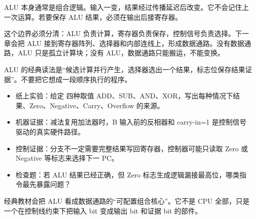ALU 本身通常是组合逻辑。输入一变，结果经过传播延迟后改变。它不会记住上一次运算。若要保存 ALU 结果，必须在输出后接寄存器。

这个边界必须分清：ALU 负责计算，寄存器负责保存，控制信号负责选择。下一章会把 ALU 接到寄存器阵列、选择器和内部连线上，形成数据通路。没有数据通路，ALU 只是孤立计算块；没有 ALU，数据通路只能搬运，不能变换。

\begin{classicnote}
ALU 的经典读法是“候选计算并行产生，选择器选出一个结果，标志位保存结果证据”。不要把它想成一段顺序执行的程序。

\begin{itemize}
\item 纸上实验：给定  四种取值 ADD、SUB、AND、XOR，写出每种情况下结果、Zero、Negative、Carry、Overflow 的来源。
\item 机器证据：减法复用加法器时，B 输入前的反相器和 carry-in=1 是控制信号驱动的真实硬件路径。
\item 控制证据：分支不一定需要完整结果写回寄存器，控制器可能只读取 Zero 或 Negative 等标志来选择下一 PC。
\item 检查题：若 ALU 结果已经正确，但 Zero 标志生成逻辑漏接最高位，哪类指令最先暴露问题？
\end{itemize}

经典教材会把 ALU 看成数据通路的“可配置组合核心”。它不是 CPU 全部，只是一个在控制线约束下把输入 bit 变成输出 bit 和证据 bit 的部件。
\end{classicnote}
